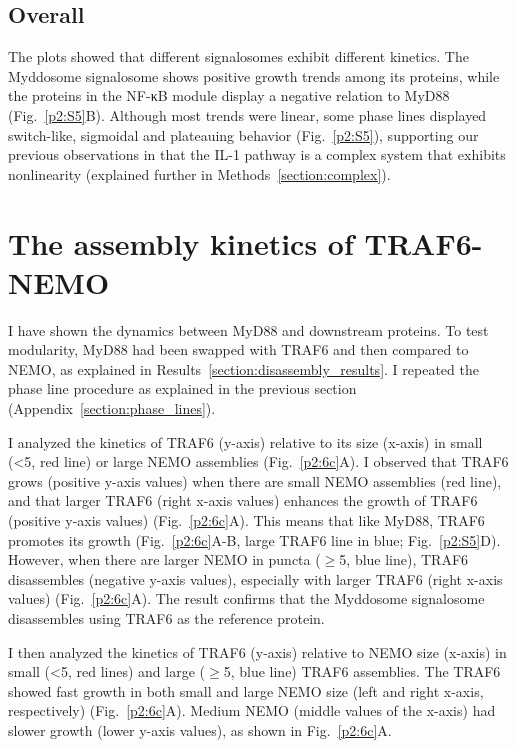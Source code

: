 \subsection{Overall}
The plots showed that different signalosomes exhibit different kinetics. The Myddosome signalosome shows positive growth trends among its proteins, while the proteins in the NF-κB module display a negative relation to MyD88 (Fig.~\ref{p2:S5}B). Although most trends were linear, some phase lines displayed switch-like, sigmoidal and plateauing behavior (Fig.~\ref{p2:S5}), supporting our previous observations in that the IL-1 pathway is a complex system that exhibits nonlinearity (explained further in Methods~\ref{section:complex}).

\section{The assembly kinetics of TRAF6-NEMO}
I have shown the dynamics between MyD88 and downstream proteins. To test modularity, MyD88 had been swapped with TRAF6 and then compared to NEMO, as explained in Results~\ref{section:disassembly_results}. I repeated the phase line procedure as explained in the previous section (Appendix~\ref{section:phase_lines}).

I analyzed the kinetics of TRAF6 (y-axis) relative to its size (x-axis) in small (<5\times, red line) or large NEMO assemblies (Fig.~\ref{p2:6c}A). I observed that TRAF6 grows (positive y-axis values) when there are small NEMO assemblies (red line), and that larger TRAF6 (right x-axis values) enhances the growth of TRAF6 (positive y-axis values) (Fig.~\ref{p2:6c}A). This means that like MyD88, TRAF6 promotes its growth (Fig.~\ref{p2:6c}A-B, large TRAF6 line in blue; Fig.~\ref{p2:S5}D). However, when there are larger NEMO in puncta ($\geq$5\times, blue line), TRAF6 disassembles (negative y-axis values), especially with larger TRAF6 (right x-axis values) (Fig.~\ref{p2:6c}A). The result confirms that the Myddosome signalosome disassembles using TRAF6 as the reference protein.

I then analyzed the kinetics of TRAF6 (y-axis) relative to NEMO size (x-axis) in small (<5\times, red lines) and large ($\geq$5\times, blue line) TRAF6 assemblies. The TRAF6 showed fast growth in both small and large NEMO size (left and right x-axis, respectively) (Fig.~\ref{p2:6c}A). Medium NEMO (middle values of the x-axis) had slower growth (lower y-axis values), as shown in  Fig.~\ref{p2:6c}A. 


